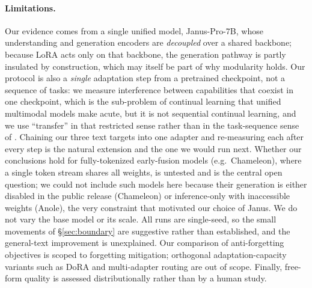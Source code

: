 \documentclass{article}
\begin{document}
\paragraph{Limitations.}
Our evidence comes from a single unified model, Janus-Pro-7B, whose
understanding and generation encoders are \emph{decoupled} over a shared
backbone; because LoRA acts only on that backbone, the generation pathway is
partly insulated by construction, which may itself be part of why modularity
holds. Our protocol is also a \emph{single} adaptation step from a pretrained
checkpoint, not a sequence of tasks: we measure interference between capabilities
that coexist in one checkpoint, which is the sub-problem of continual learning
that unified multimodal models make acute, but it is not sequential continual
learning, and we use ``transfer'' in that restricted sense rather than in the
task-sequence sense of \citet{lopezpaz2017gem}. Chaining our three text targets
into one adapter and re-measuring each after every step is the natural extension
and the one we would run next. Whether our conclusions hold for fully-tokenized
early-fusion models
(e.g.\ Chameleon), where a single token stream shares all weights, is untested
and is the central open question; we could not include such models here because
their generation is either disabled in the public release (Chameleon) or
inference-only with inaccessible weights (Anole), the very constraint that
motivated our choice of Janus. We do not vary the base model or its scale. All
runs are single-seed, so the small movements of \S\ref{sec:boundary} are
suggestive rather than established, and the general-text improvement is
unexplained. Our comparison of anti-forgetting objectives is scoped to
forgetting mitigation; orthogonal adaptation-capacity variants such as DoRA
\citep{liu2024dora} and multi-adapter routing are out of scope. Finally,
free-form quality is assessed distributionally rather than by a human study.
\end{document}
